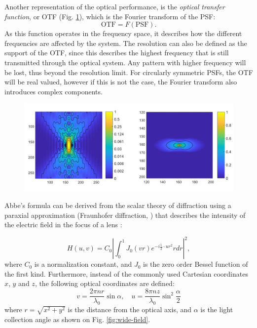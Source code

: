     Another representation of the optical performance, is the \textit{optical transfer function}, or OTF (Fig. \ref{fig:psf-wf}), which is the Fourier transform of the PSF:
    \begin{equation}
      \text{OTF} = F(\text{PSF}).
    \end{equation}
    As this function operates in the frequency space, it describes how the different frequencies are affected by the system. The resolution can also be defined as the support of the OTF, since this describes the highest frequency that is still transmitted through the optical system. Any pattern with higher frequency will be lost, thus beyond the resolution limit. For circularly symmetric PSFs, the OTF will be real valued, however if this is not the case, the Fourier transform also introduces complex components.

    \begin{figure}
      \centering
      \includegraphics[width=1\textwidth]{psfs/WF.pdf}
      \label{fig:psf-wf}
    \end{figure}


    Abbe's formula can be derived from the scalar theory of diffraction using a paraxial approximation (Fraunhofer diffraction, \cite{born_principles_2013}) that describes the intensity of the electric field in the focus of a lens \cite{sheppard_imaging_1987}:

    \begin{equation}
      H(u,v) = C_0 \left| \int_0^1 J_0 (vr)e^{-i\frac{1}{2}\cdot ur^2} rdr \right|^2,
      \label{eq:psf}
    \end{equation}
    where $C_0$ is a normalization constant, and $J_0$ is the zero order Bessel function of the first kind. Furthermore, instead of the commonly used Cartesian coordinates $x$, $y$ and $z$, the following optical coordinates are defined:
    \begin{equation}
      v = \frac{2\pi n  r}{\lambda_0} \sin \alpha, \quad
      u=\frac{8\pi n  z}{\lambda_0} \sin^2 \frac{\alpha}{2}
      \label{eq:substitutions}
    \end{equation}
    where $r = \sqrt{x^2 + y^2}$ is the distance from the optical axis, and $\alpha$ is the light collection angle as shown on Fig. \ref{fig:wide-field}. 

